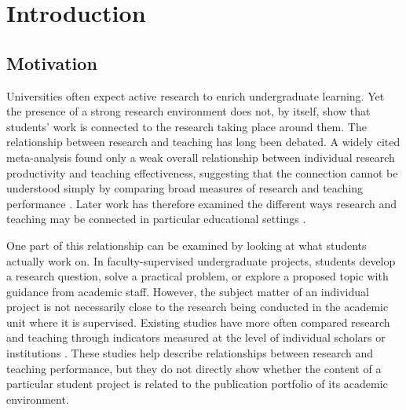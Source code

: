 \documentclass[pdflatex,sn-apa]{sn-jnl}
\begin{document}

\maketitle

\section{Introduction}

\subsection{Motivation}

Universities often expect active research to enrich undergraduate learning. Yet the presence of a strong research environment does not, by itself, show that students' work is connected to the research taking place around them. The relationship between research and teaching has long been debated. A widely cited meta-analysis found only a weak overall relationship between individual research productivity and teaching effectiveness, suggesting that the connection cannot be understood simply by comparing broad measures of research and teaching performance \citep{hattie1996relationship}. Later work has therefore examined the different ways research and teaching may be connected in particular educational settings \citep{brew2003teaching,healey2005linking,linn2015undergraduate}.

One part of this relationship can be examined by looking at what students actually work on. In faculty-supervised undergraduate projects, students develop a research question, solve a practical problem, or explore a proposed topic with guidance from academic staff. However, the subject matter of an individual project is not necessarily close to the research being conducted in the academic unit where it is supervised. Existing studies have more often compared research and teaching through indicators measured at the level of individual scholars or institutions \citep{maisano2023empirical,scafetta2025rt,xiong2026nexus}. These studies help describe relationships between research and teaching performance, but they do not directly show whether the content of a particular student project is related to the publication portfolio of its academic environment.
\end{document}
